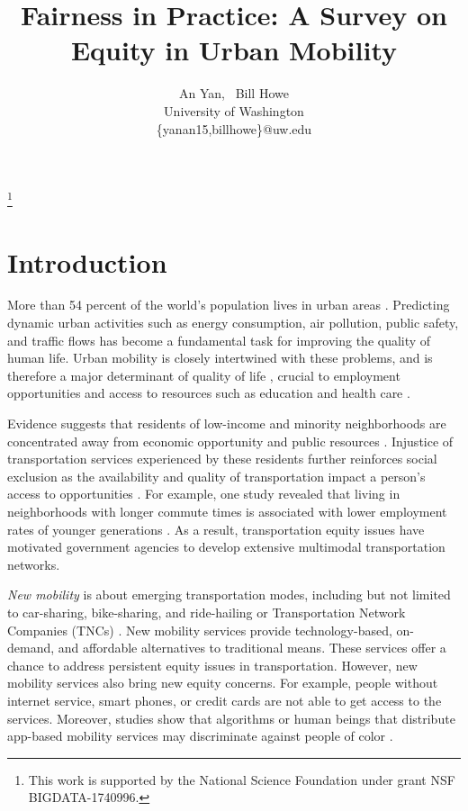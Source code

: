 \documentclass[11pt]{article}
\newcommand\blfootnote[1]{%
  \begingroup
  \renewcommand\thefootnote{}\footnote{#1}%
  \addtocounter{footnote}{-1}%
  \endgroup
}
\begin{document}
\title{Fairness in Practice: A Survey on Equity in Urban Mobility} 


\author{An Yan, \  Bill Howe \\
University of Washington\\
\{yanan15,billhowe\}@uw.edu}

\maketitle
\blfootnote{This work is supported by the National Science Foundation under grant NSF BIGDATA-1740996.}

\section{Introduction}
More than 54 percent of the world's population lives in urban areas \cite{zhang2017regions}. Predicting dynamic urban activities such as energy consumption, air pollution, public safety, and traffic flows has become a fundamental task for improving the quality of human life. Urban mobility is closely intertwined with these problems, and is therefore a major determinant of quality of life \cite{shafrin2017association}, crucial to employment opportunities and access to resources such as education and health care \cite{chan2016screening}. %

Evidence suggests that residents of low-income and minority neighborhoods are concentrated away from economic opportunity and public resources \cite{wang2018urban}. Injustice of transportation services experienced by these residents further reinforces social exclusion as the availability and quality of transportation impact a person’s access to opportunities \cite{litman2018evaluating, shaheen2017travel, palmateer2017justice, ricciardi2015exploring}. For example, one study revealed that living in neighborhoods with longer commute times is associated with lower employment rates of younger generations \cite{chetty2016childhood}. As a result, transportation equity issues have motivated government agencies to develop extensive multimodal transportation networks\cite{shaheen2017travel}. 

\textit{New mobility }is about emerging transportation modes, including but not limited to car-sharing, bike-sharing, and ride-hailing or Transportation Network Companies (TNCs) \cite{goldman2006sustainable}. New mobility services provide technology-based, on-demand, and affordable alternatives to traditional means. These services offer a chance to address persistent equity issues in transportation. However, new mobility services also bring new equity concerns. For example, people without internet service, smart phones, or credit cards are not able to get access to the services. Moreover, studies show that algorithms or human beings that distribute app-based mobility services may discriminate against people of color \cite{ge2016racial}. 
\end{document}
